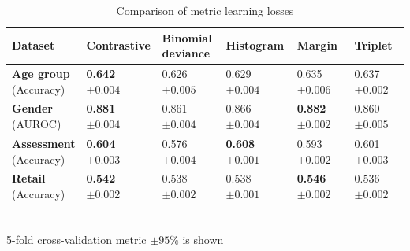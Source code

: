 \documentclass{article}
\begin{document}
\begin{table}
\centering
\caption{Comparison of metric learning losses}
\begin{tabular}{llllll}
\toprule
\textbf{Dataset} & \textbf{Contrastive} & \makecell{\textbf{Binomial} \\ \textbf{deviance}} & \textbf{Histogram} & \textbf{Margin} & \textbf{Triplet} \\
\midrule
\makecell{\textbf{Age group} \\ \small{(Accuracy)}} & \makecell{\textbf{0.642} \\ $\pm 0.004$} & \makecell{0.626 \\ $\pm 0.005$} & \makecell{0.629 \\ $\pm 0.004$} & \makecell{0.635 \\ $\pm 0.006$} & \makecell{0.637 \\ $\pm 0.002$} \\
\makecell{\textbf{Gender} \\ \small{(AUROC)}} & \makecell{\textbf{0.881} \\ $\pm 0.004$} & \makecell{0.861 \\ $\pm 0.004$} & \makecell{0.866 \\ $\pm 0.004$} & \makecell{\textbf{0.882} \\ $\pm 0.002$} & \makecell{0.860 \\ $\pm 0.005$} \\
\makecell{\textbf{Assessment} \\ \small{(Accuracy)}} & \makecell{\textbf{0.604} \\ $\pm 0.003$} & \makecell{0.576 \\ $\pm 0.004$} & \makecell{\textbf{0.608} \\ $\pm 0.001$} & \makecell{0.593 \\ $\pm 0.002$} & \makecell{0.601 \\ $\pm 0.003$} \\
\makecell{\textbf{Retail} \\ \small{(Accuracy)}} & \makecell{\textbf{0.542} \\ $\pm 0.002$} & \makecell{0.538 \\ $\pm 0.002$} & \makecell{0.538 \\ $\pm 0.001$} & \makecell{\textbf{0.546} \\ $\pm 0.002$} & \makecell{0.536 \\ $\pm 0.002$} \\
\bottomrule
\end{tabular} \\
\small{5-fold cross-validation metric $\pm 95\%$ is shown}
\label{tab-loss-type}
\end{table}
\end{document}
